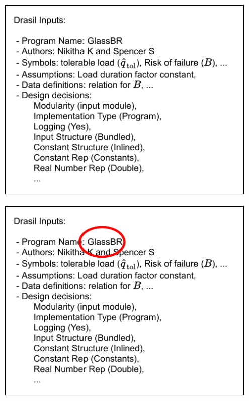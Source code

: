 \documentclass[usenames]{beamer}
\begin{document}

\begin{frame}


\includegraphics[width=0.95\textwidth]{../figures/DrasilInputs.pdf}

\end{frame}


\begin{frame}


\includegraphics[width=0.95\textwidth]{../figures/InputsCircleGlassBR.pdf}

\end{frame}
\end{document}
